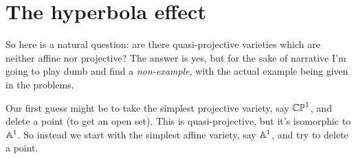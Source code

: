 %
%

\section{The hyperbola effect}

So here is a natural question: are there quasi-projective varieties
which are neither affine nor projective?
The answer is yes, but for the sake of narrative
I'm going to play dumb and find a \emph{non-example},
with the actual example being given in the problems.

Our first guess might be to take the simplest projective variety,
say $\mathbb{CP}^1$, and delete a point (to get an open set).
This is quasi-projective, but it's isomorphic to $\mathbb A^1$.
So instead we start with the simplest affine variety,
say $\mathbb A^1$, and try to delete a point.


